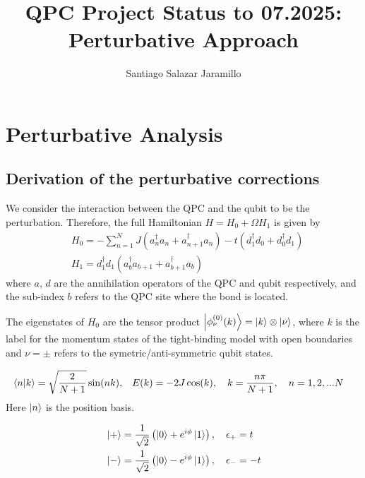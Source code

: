 \documentclass{article}
\title{QPC Project Status to 07.2025: Perturbative Approach}
\author{Santiago Salazar Jaramillo}
\date{}
\begin{document}
\maketitle

\section{Perturbative Analysis}

\subsection{Derivation of the perturbative corrections}

We consider the interaction between the QPC and the qubit to be the perturbation. Therefore, the full Hamiltonian $H = H_0 + \Omega H_1$ is given by
\begin{align}
    & H_0 = -\sum_{n=1}^{N}J(a_{n}^{\dagger} a_{n} + a_{n+1}^{\dagger}a_{n} ) - t(d_{1}^{\dagger}d_{0}+d_{0}^{\dagger}d_{1}) \\
    & H_1 = d_{1}^{\dagger}d_{1}( a_{b}^{\dagger}a_{b+1} + a^{\dagger}_{b+1}a_{b} )
\end{align}
where $a$, $d$ are the annihilation operators of the QPC and qubit respectively, and the sub-index $b$ refers to the QPC site where the bond is located. 

The eigenstates of $H_0$ are the tensor product $\ket{\phi^{(0)}_\nu (k)} = \ket{k}\otimes \ket{\nu}$, where $k$ is the label for the momentum states of the tight-binding model with open boundaries and $\nu = \pm$ refers to the symetric/anti-symmetric qubit states. 

\begin{tcolorbox}[title=QPC eigenstates, colback=white, colframe=black]
\begin{align}
    \bra{n}\ket{k} = \sqrt{\frac{2}{N+1}} \sin(n k) ,\quad & E(k) = -2J\cos(k), \quad k = \frac{n\pi}{N+1},\quad n= 1, 2,...N
\end{align}
Here $\ket{n}$ is the position basis.
\end{tcolorbox}

\begin{tcolorbox}[title=Qubit eigenstates, colback=white, colframe=black]
\begin{align}
   & \ket{+} = \frac{1}{\sqrt{2}}\left( \ket{0} + e^{i\phi} \ket{1}\right), \quad \epsilon_+ = t \\
   & \ket{-} = \frac{1}{\sqrt{2}}\left( \ket{0} - e^{i\phi} \ket{1}\right), \quad \epsilon_- = -t
\end{align}
\end{tcolorbox}
\end{document}
